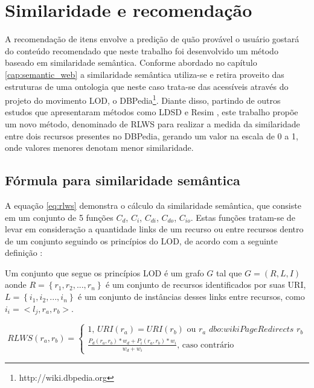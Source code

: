 \section{Similaridade e recomendação}

A recomendação de itens envolve a predição de quão provável o usuário gostará do conteúdo recomendado que neste trabalho foi desenvolvido um método baseado em similaridade semântica. Conforme abordado no capítulo \ref{cap:semantic_web} a similaridade semântica utiliza-se e retira proveito das estruturas de uma ontologia que neste caso trata-se das acessíveis através do projeto do movimento \ac{LOD}, o DBPedia\footnote{http://wiki.dbpedia.org}. Diante disso, partindo de outros estudos que apresentaram métodos como LDSD \citep{PassantLDSD} e Resim \citep{PiaoResim}, este trabalho propõe um novo método, denominado de \ac{RLWS} para realizar a medida da similaridade entre dois recursos presentes no DBPedia, gerando um valor na escala de 0 a 1, onde valores menores denotam menor similaridade.

\subsection{Fórmula para similaridade semântica}

A equação \ref{eq:rlws} demonstra o cálculo da similaridade semântica, que consiste em um conjunto de 5 funções  $C_d$, $C_i$, $C_{di}$, $C_{do}$, $C_{io}$. Estas funções tratam-se de levar em consideração a quantidade links de um recurso ou entre recursos dentro de um conjunto seguindo os princípios do \ac{LOD}, de acordo com a seguinte definição \citep{PiaoResim}:

\begin{definition}
Um conjunto que segue os princípios LOD é um grafo $G$ tal que $G = (R, L, I)$ aonde $R = \left\{r_1, r_2, ..., r_n\right\}$ é um conjunto de recursos identificados por suas URI, $L = \left\{i_1, i_2, ..., i_n\right\}$ é um conjunto de instâncias desses links entre recursos, como $i_i = <l_j, r_a, r_b>$.
\end{definition}

\begin{equation}
	RLWS(r_a, r_b) = 
	\begin{cases}
		1 \text{, } URI(r_a) = URI(r_b) \text{ ou } r_a \textit{ dbo:wikiPageRedirects } r_b\\
		\frac{P_d(r_a, r_b) * w_d + P_i(r_a, r_b) * w_i}{w_d + w_i} \text{, caso contrário}
	\end{cases}
\label{eq:rlws}
\end{equation}

